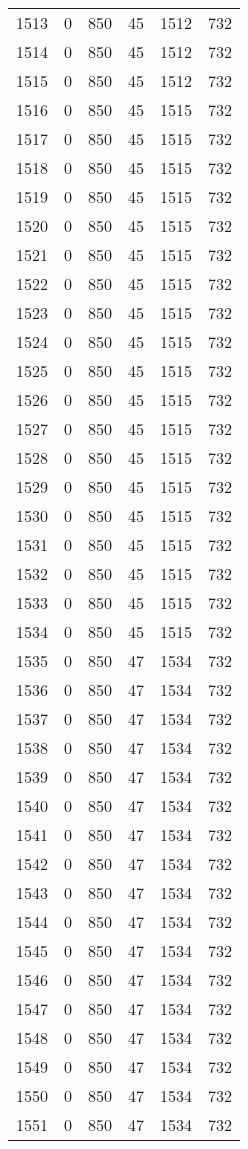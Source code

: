 \documentclass[a4paper]{ctexart}
\begin{document}
\begin{longtable}{p{1cm}|p{2cm}|p{2cm}|p{2cm}|P{2cm}|p{2cm}}
		1513&0&850&45&1512&732\\
		1514&0&850&45&1512&732\\
		1515&0&850&45&1512&732\\
		1516&0&850&45&1515&732\\
		1517&0&850&45&1515&732\\
		1518&0&850&45&1515&732\\
		1519&0&850&45&1515&732\\
		1520&0&850&45&1515&732\\
		1521&0&850&45&1515&732\\
		1522&0&850&45&1515&732\\
		1523&0&850&45&1515&732\\
		1524&0&850&45&1515&732\\
		1525&0&850&45&1515&732\\
		1526&0&850&45&1515&732\\
		1527&0&850&45&1515&732\\
		1528&0&850&45&1515&732\\
		1529&0&850&45&1515&732\\
		1530&0&850&45&1515&732\\
		1531&0&850&45&1515&732\\
		1532&0&850&45&1515&732\\
		1533&0&850&45&1515&732\\
		1534&0&850&45&1515&732\\
		1535&0&850&47&1534&732\\
		1536&0&850&47&1534&732\\
		1537&0&850&47&1534&732\\
		1538&0&850&47&1534&732\\
		1539&0&850&47&1534&732\\
		1540&0&850&47&1534&732\\
		1541&0&850&47&1534&732\\
		1542&0&850&47&1534&732\\
		1543&0&850&47&1534&732\\
		1544&0&850&47&1534&732\\
		1545&0&850&47&1534&732\\
		1546&0&850&47&1534&732\\
		1547&0&850&47&1534&732\\
		1548&0&850&47&1534&732\\
		1549&0&850&47&1534&732\\
		1550&0&850&47&1534&732\\
		1551&0&850&47&1534&732\\

\end{longtable}
\end{document}
